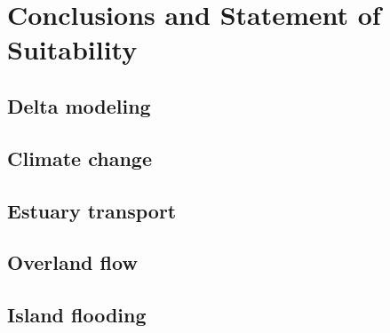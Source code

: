 \chapter{Conclusions and Statement of Suitability} 
\section{Delta modeling}
\section{Climate change}
\section{Estuary transport}
\section{Overland flow}
\section{Island flooding}